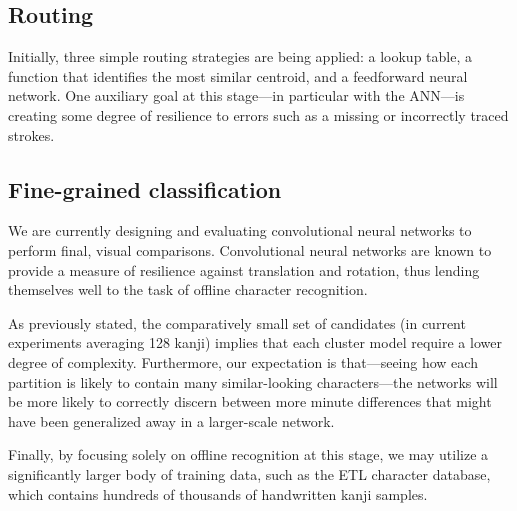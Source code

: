 \documentclass[10pt,conference,a4paper]{IEEEtran}
\begin{document}


	\subsection{Routing}

	Initially, three simple routing strategies are being applied: a lookup table, a function that
	identifies the most similar centroid, and a feedforward neural network. One auxiliary goal
	at this stage---in particular with the ANN---is creating some degree of resilience to errors
	such as a missing or incorrectly traced strokes.


	\subsection{Fine-grained classification}

	We are currently designing and evaluating convolutional neural networks to perform final, visual comparisons.
	Convolutional neural networks are known to provide a measure of resilience against translation and rotation,
	thus lending themselves well to the task of offline character recognition.
	
	As previously stated, the comparatively small set of candidates (in current experiments averaging 128 kanji)
	implies that each cluster model require a lower degree of complexity. Furthermore, our expectation is that---seeing
	how each partition is likely to contain many similar-looking characters---the networks will be more likely
	to correctly discern between more minute differences that might have been generalized away in a larger-scale network.

	Finally, by focusing solely on offline recognition at this stage, we may utilize a significantly larger body of 
	training data, such as the ETL character database, which contains hundreds of thousands of handwritten kanji samples. \cite{yamamoto1986recognition} 
\end{document}
